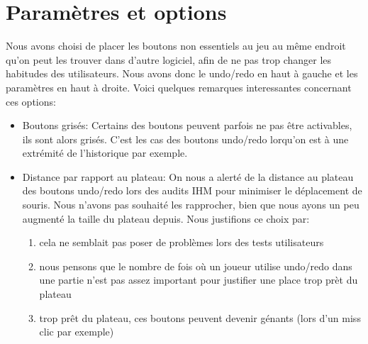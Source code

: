 \documentclass{report}
\begin{document}
\section{Paramètres et options}
Nous avons choisi de placer les boutons non essentiels au jeu au même endroit qu'on peut les trouver dans d'autre logiciel, afin de ne pas trop changer les habitudes des utilisateurs. Nous avons donc le undo/redo en haut à gauche et les paramètres en haut à droite. Voici quelques remarques interessantes concernant ces options:

\begin{itemize}
\item Boutons grisés: Certains des boutons peuvent parfois ne pas être activables, ils sont alors grisés. C'est les cas des boutons undo/redo lorqu'on est à une extrémité de l'historique par exemple.

\item Distance par rapport au plateau: On nous a alerté de la distance au plateau des boutons undo/redo lors des audits IHM pour minimiser le déplacement de souris. Nous n'avons pas souhaité les rapprocher, bien que nous ayons un peu augmenté la taille du plateau depuis. Nous justifions ce choix par:
  \begin {enumerate}
  \item cela ne semblait pas poser de problèmes lors des tests utilisateurs
  \item nous pensons que le nombre de fois où un joueur utilise undo/redo dans une partie n'est pas assez important pour justifier une place trop prèt du plateau
  \item trop prêt du plateau, ces boutons peuvent devenir génants (lors d'un miss clic par exemple)
  \end{enumerate}


\end{itemize}
\end{document}

